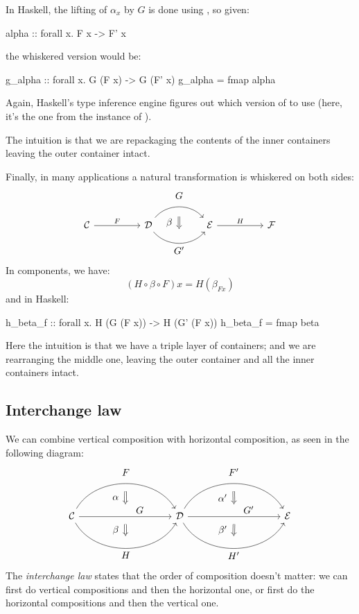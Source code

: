 \documentclass[DaoFP]{subfiles}
\begin{document}
In Haskell, the lifting of $\alpha_x$ by $G$ is done using , so given:
\begin{haskell}
alpha :: forall x. F x -> F' x
\end{haskell}
the whiskered version would be:
\begin{haskell}
g_alpha :: forall x. G (F x) -> G (F' x)
g_alpha = fmap alpha
\end{haskell}
Again, Haskell's type inference engine figures out which version of  to use (here, it's the one from the  instance of ).

The intuition is that we are repackaging the contents of the inner containers leaving the outer container intact.

Finally, in many applications a natural transformation is whiskered on both sides:
\[
\begin{tikzcd}[column sep=huge]
\mathcal{C}
 \arrow[r, "F"]
 &
\mathcal{D}
  \arrow[bend left=50]{r}[name=U1, label=above:$G$]{}
  \arrow[bend right=50]{r}[name=D1, label=below:$G'$]{} 
 &
\mathcal{E}
  \arrow[shorten <=10pt,shorten >=10pt,Rightarrow,to path={(U1) -- node[label=left:$\beta$] {} (D1)}]{}
  \arrow[r, "H"]
 &
 \mathcal{F}
\end{tikzcd}
\]
In components, we have:
\[ (H \circ \beta \circ F) x = H (\beta_{F x})\]
and in Haskell:
\begin{haskell}
h_beta_f :: forall x. H (G (F x)) -> H (G' (F x))
h_beta_f = fmap beta
\end{haskell}

Here the intuition is that we have a triple layer of containers; and we are rearranging the middle one, leaving the outer container and all the inner containers intact.

\subsection{Interchange law}

We can combine vertical composition with horizontal composition, as seen in the following diagram:
\[
\begin{tikzcd}[column sep=huge]
\mathcal{C}
  \arrow[bend left=60]{rr}[name=U, label=above:$F$]{}
  \arrow[]{rr}[name=M, label={[xshift=15pt, yshift=-5pt]:$G$}]{} 
  \arrow[bend right=60]{rr}[name=D, label=below:$H$]{} 
 &&
\mathcal{D}
  \arrow[bend left=60]{rr}[name=U1, label=above:$F'$]{}
  \arrow[]{rr}[name=M1, label={[xshift=15pt, yshift=-5pt]:$G'$}]{} 
  \arrow[bend right=60]{rr}[name=D1, label=below:$H'$]{} 
&&
\mathcal{E}
  \arrow[shorten <=8pt, shorten >=8pt,Rightarrow, to path={(U) -- node[label=left:$\alpha$] {} (M)}]{}
  \arrow[shorten <=8pt, shorten >=8pt,Rightarrow, to path={(M) -- node[label=left:$\beta$] {} (D)}]{}
  \arrow[shorten <=8pt, shorten >=8pt,Rightarrow, to path={(U1) -- node[label=left:$\alpha'$] {} (M1)}]{}
  \arrow[shorten <=8pt, shorten >=8pt,Rightarrow, to path={(M1) -- node[label=left:$\beta'$] {} (D1)}]{}
\end{tikzcd}
\]
The \emph{interchange law} states that the order of composition doesn't matter: we can first do vertical compositions and then the horizontal one, or first do the horizontal compositions and then the vertical one.
\end{document}
